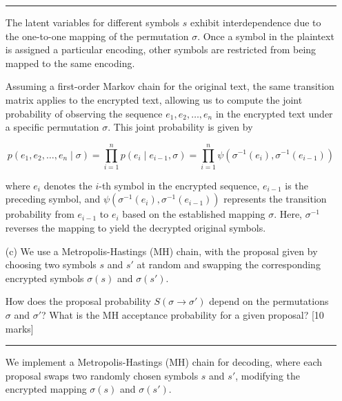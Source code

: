\documentclass{article}
\begin{document}
\begin{enumerate}
    \noindent\textcolor{gray}{\rule{0.1\linewidth}{0.4pt}}
    \vspace{10pt}

    The latent variables for different symbols \( s \) exhibit interdependence due to the one-to-one mapping of the permutation \( \sigma \). Once a symbol in the plaintext is assigned a particular encoding, other symbols are restricted from being mapped to the same encoding.
    \vspace{0.8em}
    
    Assuming a first-order Markov chain for the original text, the same transition matrix applies to the encrypted text, allowing us to compute the joint probability of observing the sequence \( e_1, e_2, \ldots, e_n \) in the encrypted text under a specific permutation \( \sigma \). This joint probability is given by
    
    \begin{equation}
    \boxed{p(e_1, e_2, \ldots, e_n \mid \sigma) = \prod_{i=1}^{n} p(e_i \mid e_{i-1}, \sigma) = \prod_{i=1}^{n} \psi(\sigma^{-1}(e_i), \sigma^{-1}(e_{i-1}))}
    \end{equation}
    
    where \( e_i \) denotes the \( i \)-th symbol in the encrypted sequence, \( e_{i-1} \) is the preceding symbol, and \( \psi(\sigma^{-1}(e_i), \sigma^{-1}(e_{i-1})) \) represents the transition probability from \( e_{i-1} \) to \( e_i \) based on the established mapping \( \sigma \). Here, \( \sigma^{-1} \) reverses the mapping to yield the decrypted original symbols.
    \vspace{0.5em}

    \item[(c)] We use a Metropolis-Hastings (MH) chain, with the proposal given by choosing two symbols \( s \) and \( s' \) at random and swapping the corresponding encrypted symbols \( \sigma(s) \) and \( \sigma(s') \).
    
    How does the proposal probability \( S(\sigma \rightarrow \sigma') \) depend on the permutations \( \sigma \) and \( \sigma' \)? What is the MH acceptance probability for a given proposal? [10 marks]

    \noindent\textcolor{gray}{\rule{0.1\linewidth}{0.4pt}}
    \vspace{10pt}

    We implement a Metropolis-Hastings (MH) chain for decoding, where each proposal swaps two randomly chosen symbols \( s \) and \( s' \), modifying the encrypted mapping \( \sigma(s) \) and \( \sigma(s') \).
    

\end{enumerate}
\end{document}
